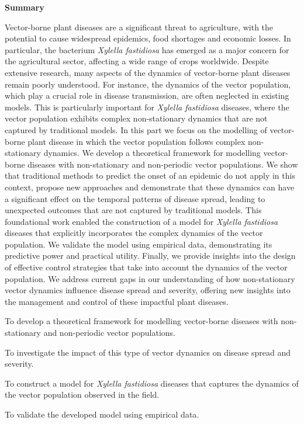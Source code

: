 \thispagestyle{empty}

\begin{center}
    \textbf{\Large Summary}
\end{center}

Vector-borne plant diseases are a significant threat to agriculture, with the
potential to cause widespread epidemics, food shortages and economic losses.
In particular, the bacterium \textit{Xylella fastidiosa} has emerged as a major
concern for the agricultural sector, affecting a wide range of crops worldwide.
Despite extensive research, many aspects of the dynamics of vector-borne plant
diseases remain poorly understood. For instance, the dynamics of the vector
population, which play a crucial role in disease transmission, are often
neglected in existing models. This is particularly important for
\textit{Xylella fastidiosa} diseases, where the vector population exhibits
complex non-stationary dynamics that are not captured by traditional
models. In this part we focus on the modelling of vector-borne plant disease in
which the vector population follows complex non-stationary dynamics. We develop
a theoretical framework for modelling vector-borne diseases with non-stationary
and non-periodic vector populations. We show that traditional methods to
predict the onset of an epidemic do not apply in this context, propose new
approaches and demonstrate that these dynamics can have a significant
effect on the temporal patterns of disease spread, leading to unexpected
outcomes that are not captured by traditional models. This foundational work
enabled the construction of a model for \textit{Xylella fastidiosa} diseases
that explicitly incorporates the complex dynamics of the vector population. We
validate the model using empirical data, demonstrating its predictive power and
practical utility. Finally, we provide insights into the design of effective
control strategies that take into account the dynamics of the vector
population. We address current gaps in our understanding of how non-stationary
vector dynamics influence disease spread and severity, offering new insights
into the management and control of these impactful plant diseases.

\vspace{1cm}

\begin{objectiveslist}
    \item To develop a theoretical framework for modelling vector-borne
    diseases with non-stationary and non-periodic vector populations.

    \item To investigate the impact of this type of vector dynamics on
    disease spread and severity.

    \item To construct a model for \textit{Xylella fastidiosa} diseases that
    captures the dynamics of the vector population observed in the field.

    \item To validate the developed model using empirical data.

\end{objectiveslist}

